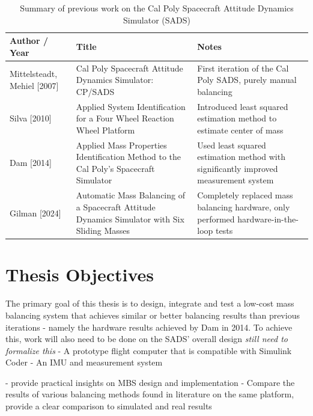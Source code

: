 \begin{table}[h!]
\caption{Summary of previous work on the Cal Poly Spacecraft Attitude Dynamics Simulator (SADS)}
\label{table:sads_history}
\centering
\renewcommand{\arraystretch}{1.4} %

\begin{tabularx}{\textwidth}{
    >{\raggedright\arraybackslash}p{4cm}   %
    >{\raggedright\arraybackslash}p{5cm}   %
    >{\raggedright\arraybackslash}X}       %
\hline
\textbf{Author / Year} & \textbf{Title} & \textbf{Notes} \\
\hline
Mittelsteadt, Mehiel [2007] & 
Cal Poly Spacecraft Attitude Dynamics Simulator: CP/SADS & 
First iteration of the Cal Poly SADS, purely manual balancing \\[2.0em]

Silva [2010] & 
Applied System Identification for a Four Wheel Reaction Wheel Platform & 
Introduced least squared estimation method to estimate center of mass \\[2.0em]

Dam [2014] & 
Applied Mass Properties Identification Method to the Cal Poly's Spacecraft Simulator & 
Used least squared estimation method with significantly improved measurement system \\[2.0em]

Gilman [2024] & 
Automatic Mass Balancing of a Spacecraft Attitude Dynamics Simulator with Six Sliding Masses & 
Completely replaced mass balancing hardware, only performed hardware-in-the-loop tests \\
\hline
\end{tabularx}
\end{table}

\section{Thesis Objectives}

The primary goal of this thesis is to design, integrate and test a low-cost mass balancing system that achieves similar or better balancing results than previous iterations - namely the hardware results achieved by Dam in 2014. To achieve this, work will also need to be done on the SADS' overall design \textit{still need to formalize this}
- A prototype flight computer that is compatible with Simulink Coder
- An IMU and measurement system

- provide practical insights on MBS design and implementation
- Compare the results of various balancing methods found in literature on the same platform, provide a clear comparison to simulated and real results

